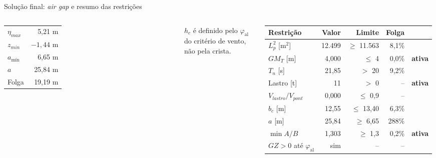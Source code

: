 \documentclass[aspectratio=169,10pt]{beamer}
\newcommand{\phial}{\varphi_{\mathrm{al}}}
\newcommand{\amin}{a_{\text{mín}}}
\begin{document}
\begin{frame}{Solução final: \emph{air gap} e resumo das restrições}
\begin{columns}[T]
\small
\begin{tabular}{lr}
\toprule
$\eta_{max}$ & 5,21 m \\
$z_{min}$ & $-1{,}44$ m \\
$\amin$ & 6,65 m \\
$a$ & 25,84 m \\
Folga & 19,19 m \\
\bottomrule
\end{tabular}
\vspace{2mm}

\footnotesize $h_c$ é definido pelo $\phial$ do critério de vento, não pela crista.
\scriptsize
\begin{tabular}{lrrrl}
\toprule
Restrição & Valor & Limite & Folga & \\
\midrule
$L_p^2$ [m$^2$] & 12.499 & $\ge$ 11.563 & 8,1\% & \\
$GM_T$ [m] & 4,000 & $\le$ 4 & 0,0\% & \textbf{ativa} \\
$T_n$ [s] & 21,85 & $>$ 20 & 9,2\% & \\
Lastro [t] & 11 & $>$ 0 & -- & \textbf{ativa} \\
$V_{lastro}/V_{pont}$ & 0,000 & $\le$ 0,9 & -- & \\
$b_c$ [m] & 12,55 & $\le$ 13,40 & 6,3\% & \\
$a$ [m] & 25,84 & $\ge$ 6,65 & 288\% & \\
$\min A/B$ & 1,303 & $\ge$ 1,3 & 0,2\% & \textbf{ativa} \\
$GZ > 0$ até $\phial$ & sim & -- & -- & \\
\bottomrule
\end{tabular}
\end{columns}
\end{frame}
\end{document}
